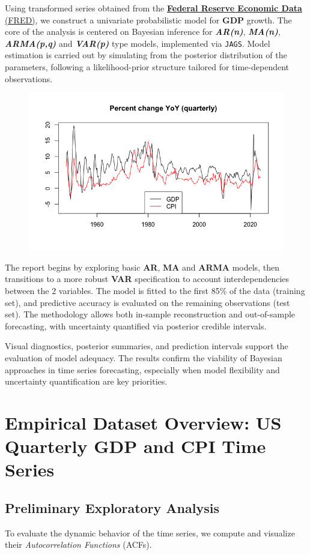 \documentclass{Configuration_Files/PoliMi3i_thesis}
\begin{document}
Using transformed series obtained from the \href{https://fred.stlouisfed.org/series/CPIAUCSL}{\textbf{Federal Reserve Economic Data} (FRED)}, we construct a univariate probabilistic model for \textbf{GDP} growth. The core of the analysis is centered on Bayesian inference for \textbf{\textit{AR(n)}}, \textbf{\textit{MA(n)}}, \textbf{\textit{ARMA(p,q)}} and \textbf{\textit{VAR(p)}} type models, implemented via \texttt{JAGS}. Model estimation is carried out by simulating from the posterior distribution of the parameters, following a likelihood-prior structure tailored for time-dependent observations.
\begin{figure}[H]
    \centering
    \includegraphics[width=0.75\linewidth]{INIT.png}
\end{figure}
The report begins by exploring basic \textbf{AR}, \textbf{MA} and \textbf{ARMA} models, then transitions to a more robust \textbf{VAR} specification to account interdependencies between the 2 variables. The model is fitted to the first 85\% of the data (training set), and predictive accuracy is evaluated on the remaining observations (test set). The methodology allows both in-sample reconstruction and out-of-sample forecasting, with uncertainty quantified via posterior credible intervals.

Visual diagnostics, posterior summaries, and prediction intervals support the evaluation of model adequacy. The results confirm the viability of Bayesian approaches in time series forecasting, especially when model flexibility and uncertainty quantification are key priorities. 
\newpage

\mainmatter
\chapter{Empirical Dataset Overview: US Quarterly GDP and CPI Time Series}
\label{ch:chapter_one}
\section{Preliminary Exploratory Analysis}
To evaluate the dynamic behavior of the time series, we compute and visualize their \textit{Autocorrelation Functions} (ACFs).
\end{document}
